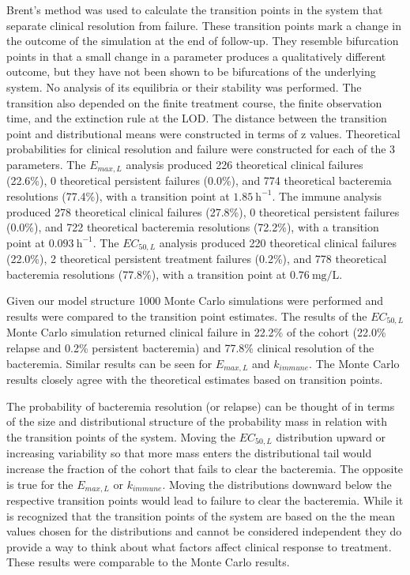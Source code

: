 \documentclass[journal]{IEEEtran}
\begin{document}
Brent's method was used to calculate the transition points in the system that separate clinical resolution from failure. These transition points mark a change in the outcome of the simulation at the end of follow-up. They resemble bifurcation points in that a small change in a parameter produces a qualitatively different outcome, but they have not been shown to be bifurcations of the underlying system.  No analysis of its equilibria or their stability was performed. The transition also depended on the finite treatment course, the finite observation time, and the extinction rule at the LOD. The distance between the transition point and distributional means were constructed in terms of z values.  Theoretical probabilities for clinical resolution and failure were constructed for each of the 3 parameters.  The $E_{max,L}$ analysis produced 226 theoretical clinical failures (22.6\%), 0 theoretical persistent failures (0.0\%), and 774 theoretical bacteremia resolutions (77.4\%), with a transition point at $1.85~\mathrm{h}^{-1}$. The immune analysis produced 278 theoretical clinical failures (27.8\%), 0 theoretical persistent failures (0.0\%), and 722 theoretical bacteremia resolutions (72.2\%), with a transition point at $0.093~\mathrm{h}^{-1}$.  The $EC_{50,L}$ analysis produced 220 theoretical clinical failures (22.0\%), 2 theoretical persistent treatment failures (0.2\%), and 778 theoretical bacteremia resolutions (77.8\%), with a transition point at $0.76~\mathrm{mg/L}$.

Given our model structure 1000 Monte Carlo simulations were performed and results were compared to the transition point estimates.  The results of the $EC_{50,L}$ Monte Carlo simulation returned clinical failure in 22.2\% of the cohort (22.0\% relapse and 0.2\% persistent bacteremia) and 77.8\% clinical resolution of the bacteremia.  Similar results can be seen for $E_{max,L}$ and $k_{immune}$.  The Monte Carlo results closely agree with the theoretical estimates based on transition points.

The probability of bacteremia resolution (or relapse) can be thought of in terms of the size and distributional structure of the probability mass in relation with the transition points of the system.  Moving the $EC_{50,L}$ distribution upward or increasing variability so that more mass enters the distributional tail would increase the fraction of the cohort that fails to clear the bacteremia.  The opposite is true for the $E_{max,L}$ or $k_{immune}$.  Moving the distributions downward below the respective transition points would lead to failure to clear the bacteremia.  While it is recognized that the transition points of the system are based on the the mean values chosen for the distributions and cannot be considered independent they do provide a way to think about what factors affect clinical response to treatment.  These results were comparable to the Monte Carlo results.
\end{document}
